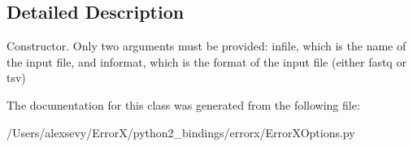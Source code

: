 \subsection{Detailed Description}
\begin{DoxyVerb}    Constructor. Only two arguments must be provided:
    infile, which is the name of the input file, and
    informat, which is the format of the input file
    (either fastq or tsv)
\end{DoxyVerb}
 

The documentation for this class was generated from the following file\+:\begin{DoxyCompactItemize}
\item 
/\+Users/alexsevy/\+Error\+X/python2\+\_\+bindings/errorx/Error\+X\+Options.\+py\end{DoxyCompactItemize}
